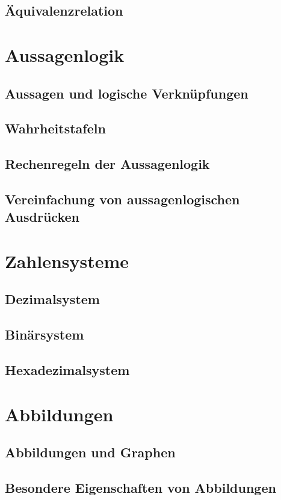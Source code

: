 \documentclass[a4paper,10pt]{article}
\begin{document}
\subsection{Äquivalenzrelation}



\section{Aussagenlogik}
\subsection{Aussagen und logische Verknüpfungen}
\subsection{Wahrheitstafeln}
\subsection{Rechenregeln der Aussagenlogik}
\subsection{Vereinfachung von aussagenlogischen Ausdrücken}




\section{Zahlensysteme}
\subsection{Dezimalsystem}
\subsection{Binärsystem}
\subsection{Hexadezimalsystem}




\section{Abbildungen}
\subsection{Abbildungen und Graphen}
\subsection{Besondere Eigenschaften von Abbildungen}
\end{document}
